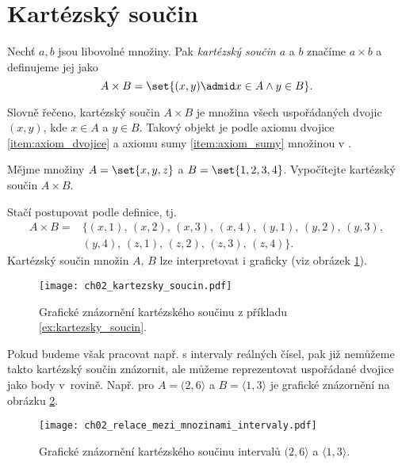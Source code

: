 \section{Kartézský součin}\label{sec:kartezsky_soucin}
\begin{definition}\label{def:kartezsky_soucin}
    Nechť $a,b$ jsou libovolné množiny. Pak \emph{kartézský součin} $a$ a $b$ značíme $a\times b$ a definujeme jej jako
    \begin{equation*}
        A\times B=\set{(x,y) \admid x\in A \land y\in B}.
    \end{equation*}
\end{definition}
Slovně řečeno, kartézský součin $A\times B$ je množina všech uspořádaných dvojic $(x,y)$, kde $x\in A$ a $y\in B$. Takový objekt je podle axiomu dvojice \ref{item:axiom_dvojice} a axiomu sumy \ref{item:axiom_sumy} množinou v \ZF{}.
\begin{example}\label{ex:kartezsky_soucin}
    Mějme množiny $A=\set{x,y,z}$ a $B=\set{1,2,3,4}$. Vypočítejte kartézský součin $A\times B$.
\end{example}
\begin{solution}
    Stačí postupovat podle definice, tj.
    \begin{align*}
        A\times B=&\{(x,1),\,(x,2),\,(x,3),\,(x,4),\,(y,1),\,(y,2),\,(y,3),\\
        &(y,4),\,(z,1),\,(z,2),\,(z,3),\,(z,4)\}.
    \end{align*}
    Kartézský součin množin $A,\,B$ lze interpretovat i graficky (viz obrázek \ref{fig:kartezsky_soucin}).
\end{solution}
\begin{figure}[H]
    \centering
    \texttt{[image: ch02\_kartezsky\_soucin.pdf]}
    \caption{Grafické znázornění kartézského součinu z příkladu \ref{ex:kartezsky_soucin}.}
    \label{fig:kartezsky_soucin}
\end{figure}
Pokud budeme však pracovat např. s intervaly reálných čísel, pak již nemůžeme takto kartézský součin znázornit, ale můžeme reprezentovat uspořádané dvojice jako body v~rovině. Např. pro $A=(2, 6\rangle$ a $B=\langle 1,3 \rangle$ je grafické znázornění na obrázku \ref{fig:kartezsky_soucin_intervaly}.
\begin{figure}[H]
    \centering
    \texttt{[image: ch02\_relace\_mezi\_mnozinami\_intervaly.pdf]}
    \caption{Grafické znázornění kartézského součinu intervalů $(2, 6\rangle$ a $\langle 1,3 \rangle$.}
    \label{fig:kartezsky_soucin_intervaly}
\end{figure}
